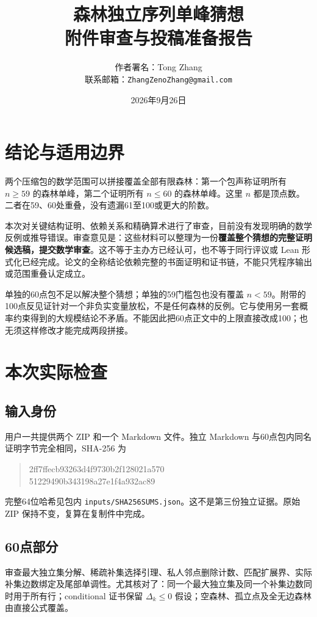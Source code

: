 \documentclass[UTF8,10pt,a4paper]{ctexart}
\title{森林独立序列单峰猜想\\附件审查与投稿准备报告}
\author{作者署名：Tong Zhang\\联系邮箱：\texttt{ZhangZenoZhang@gmail.com}}
\date{2026年9月26日}
\begin{document}
\maketitle
\section{结论与适用边界}
两个压缩包的数学范围可以拼接覆盖全部有限森林：第一个包声称证明所有 $n\ge59$ 的森林单峰，第二个证明所有 $n\le60$ 的森林单峰。这里 $n$ 都是顶点数。二者在59、60处重叠，没有遗漏61至100或更大的阶数。

本次对关键结构证明、依赖关系和精确算术进行了审查，目前没有发现明确的数学反例或推导错误。审查意见是：这些材料可以整理为一份\textbf{覆盖整个猜想的完整证明候选稿，提交数学审查}。这不等于主办方已经认可，也不等于同行评议或 Lean 形式化已经完成。论文的全称结论依赖完整的书面证明和证书链，不能只凭程序输出或范围重叠认定成立。

单独的60点包不足以解决整个猜想；单独的59门槛包也没有覆盖 $n<59$。附带的100点反见证针对一个非负实变量放松，不是任何森林的反例。它与使用另一套概率约束得到的大规模结论不矛盾。不能因此把60点正文中的上限直接改成100；也无须这样修改才能完成两段拼接。

\section{本次实际检查}
\subsection{输入身份}
用户一共提供两个 ZIP 和一个 Markdown 文件。独立 Markdown 与60点包内同名证明字节完全相同，SHA-256 为
\begin{quote}\small\ttfamily
2ff7ffecb93263d4f9730b2f128021a570\\
51229490b343198a27e1f4a932ac89
\end{quote}
完整64位哈希见包内 \texttt{inputs/SHA256SUMS.json}。这不是第三份独立证据。原始 ZIP 保持不变，复算在复制件中完成。

\subsection{60点部分}
审查最大独立集分解、稀疏补集选择引理、私人邻点删除计数、匹配扩展界、实际补集边数绑定及尾部单调性。尤其核对了：同一个最大独立集及同一个补集边数同时用于所有行；conditional 证书保留 $\Delta_k\le0$ 假设；空森林、孤立点及全无边森林由直接公式覆盖。
\end{document}
